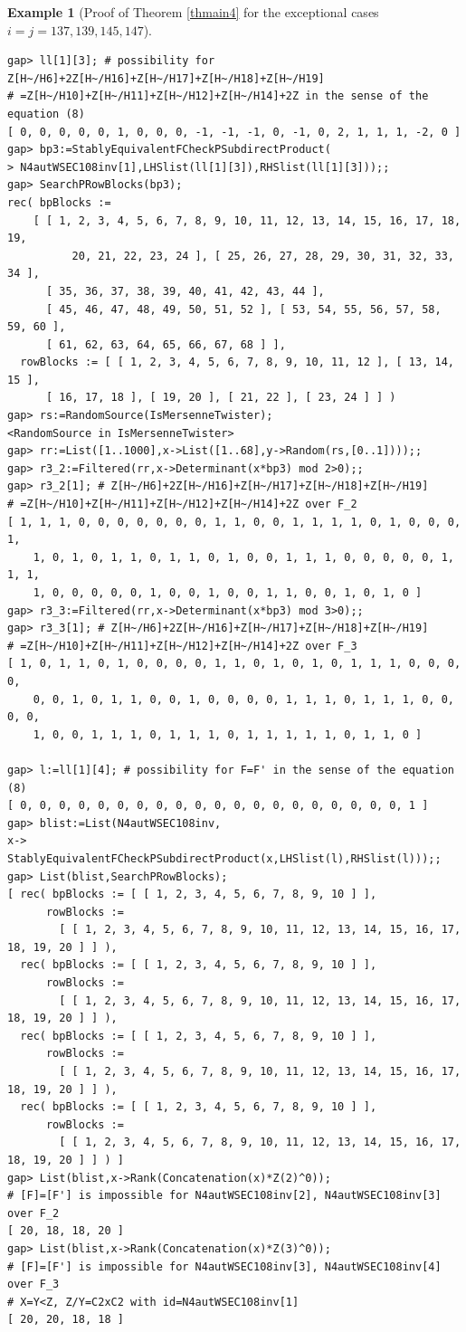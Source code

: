 \documentclass{amsart}
\theoremstyle{plain}
\theoremstyle{definition}
\newtheorem{example}[theorem]{Example}
\theoremstyle{remark}
\begin{document}
\begin{example}[Proof of {Theorem \ref{thmain4}} for the exceptional cases $i=j=137,139,145,147$]
\begin{verbatim}
gap> ll[1][3]; # possibility for Z[H~/H6]+2Z[H~/H16]+Z[H~/H17]+Z[H~/H18]+Z[H~/H19]
# =Z[H~/H10]+Z[H~/H11]+Z[H~/H12]+Z[H~/H14]+2Z in the sense of the equation (8) 
[ 0, 0, 0, 0, 0, 1, 0, 0, 0, -1, -1, -1, 0, -1, 0, 2, 1, 1, 1, -2, 0 ]
gap> bp3:=StablyEquivalentFCheckPSubdirectProduct(
> N4autWSEC108inv[1],LHSlist(ll[1][3]),RHSlist(ll[1][3]));;
gap> SearchPRowBlocks(bp3);
rec( bpBlocks := 
    [ [ 1, 2, 3, 4, 5, 6, 7, 8, 9, 10, 11, 12, 13, 14, 15, 16, 17, 18, 19, 
          20, 21, 22, 23, 24 ], [ 25, 26, 27, 28, 29, 30, 31, 32, 33, 34 ], 
      [ 35, 36, 37, 38, 39, 40, 41, 42, 43, 44 ], 
      [ 45, 46, 47, 48, 49, 50, 51, 52 ], [ 53, 54, 55, 56, 57, 58, 59, 60 ], 
      [ 61, 62, 63, 64, 65, 66, 67, 68 ] ], 
  rowBlocks := [ [ 1, 2, 3, 4, 5, 6, 7, 8, 9, 10, 11, 12 ], [ 13, 14, 15 ], 
      [ 16, 17, 18 ], [ 19, 20 ], [ 21, 22 ], [ 23, 24 ] ] )
gap> rs:=RandomSource(IsMersenneTwister);
<RandomSource in IsMersenneTwister>
gap> rr:=List([1..1000],x->List([1..68],y->Random(rs,[0..1])));;
gap> r3_2:=Filtered(rr,x->Determinant(x*bp3) mod 2>0);;
gap> r3_2[1]; # Z[H~/H6]+2Z[H~/H16]+Z[H~/H17]+Z[H~/H18]+Z[H~/H19]
# =Z[H~/H10]+Z[H~/H11]+Z[H~/H12]+Z[H~/H14]+2Z over F_2
[ 1, 1, 1, 0, 0, 0, 0, 0, 0, 0, 1, 1, 0, 0, 1, 1, 1, 1, 0, 1, 0, 0, 0, 1, 
    1, 0, 1, 0, 1, 1, 0, 1, 1, 0, 1, 0, 0, 1, 1, 1, 0, 0, 0, 0, 0, 1, 1, 1, 
    1, 0, 0, 0, 0, 0, 1, 0, 0, 1, 0, 0, 1, 1, 0, 0, 1, 0, 1, 0 ]
gap> r3_3:=Filtered(rr,x->Determinant(x*bp3) mod 3>0);;
gap> r3_3[1]; # Z[H~/H6]+2Z[H~/H16]+Z[H~/H17]+Z[H~/H18]+Z[H~/H19]
# =Z[H~/H10]+Z[H~/H11]+Z[H~/H12]+Z[H~/H14]+2Z over F_3
[ 1, 0, 1, 1, 0, 1, 0, 0, 0, 0, 1, 1, 0, 1, 0, 1, 0, 1, 1, 1, 0, 0, 0, 0, 
    0, 0, 1, 0, 1, 1, 0, 0, 1, 0, 0, 0, 0, 1, 1, 1, 0, 1, 1, 1, 0, 0, 0, 0, 
    1, 0, 0, 1, 1, 1, 0, 1, 1, 1, 0, 1, 1, 1, 1, 1, 0, 1, 1, 0 ]

gap> l:=ll[1][4]; # possibility for F=F' in the sense of the equation (8)
[ 0, 0, 0, 0, 0, 0, 0, 0, 0, 0, 0, 0, 0, 0, 0, 0, 0, 0, 0, 0, 1 ]
gap> blist:=List(N4autWSEC108inv,
x-> StablyEquivalentFCheckPSubdirectProduct(x,LHSlist(l),RHSlist(l)));;
gap> List(blist,SearchPRowBlocks);
[ rec( bpBlocks := [ [ 1, 2, 3, 4, 5, 6, 7, 8, 9, 10 ] ], 
      rowBlocks := 
        [ [ 1, 2, 3, 4, 5, 6, 7, 8, 9, 10, 11, 12, 13, 14, 15, 16, 17, 18, 19, 20 ] ] ), 
  rec( bpBlocks := [ [ 1, 2, 3, 4, 5, 6, 7, 8, 9, 10 ] ], 
      rowBlocks := 
        [ [ 1, 2, 3, 4, 5, 6, 7, 8, 9, 10, 11, 12, 13, 14, 15, 16, 17, 18, 19, 20 ] ] ), 
  rec( bpBlocks := [ [ 1, 2, 3, 4, 5, 6, 7, 8, 9, 10 ] ], 
      rowBlocks := 
        [ [ 1, 2, 3, 4, 5, 6, 7, 8, 9, 10, 11, 12, 13, 14, 15, 16, 17, 18, 19, 20 ] ] ), 
  rec( bpBlocks := [ [ 1, 2, 3, 4, 5, 6, 7, 8, 9, 10 ] ], 
      rowBlocks := 
        [ [ 1, 2, 3, 4, 5, 6, 7, 8, 9, 10, 11, 12, 13, 14, 15, 16, 17, 18, 19, 20 ] ] ) ]
gap> List(blist,x->Rank(Concatenation(x)*Z(2)^0)); 
# [F]=[F'] is impossible for N4autWSEC108inv[2], N4autWSEC108inv[3] over F_2
[ 20, 18, 18, 20 ]
gap> List(blist,x->Rank(Concatenation(x)*Z(3)^0)); 
# [F]=[F'] is impossible for N4autWSEC108inv[3], N4autWSEC108inv[4] over F_3
# X=Y<Z, Z/Y=C2xC2 with id=N4autWSEC108inv[1]
[ 20, 20, 18, 18 ]


\end{verbatim}
\end{example}
\end{document}
